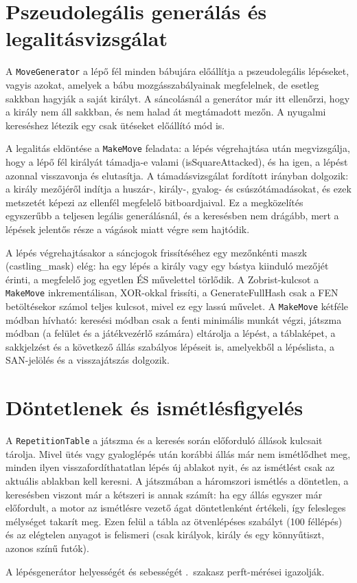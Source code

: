 \section{Pszeudolegális generálás és legalitásvizsgálat}

A \texttt{MoveGenerator} a lépő fél minden bábujára előállítja a pszeudolegális lépéseket, vagyis azokat, amelyek a bábu mozgásszabályainak megfelelnek, de esetleg sakkban hagyják a saját királyt. A sáncolásnál a generátor már itt ellenőrzi, hogy a király nem áll sakkban, és nem halad át megtámadott mezőn. A nyugalmi kereséshez létezik egy csak ütéseket előállító mód is.

A legalitás eldöntése a \texttt{MakeMove} feladata: a lépés végrehajtása után megvizsgálja, hogy a lépő fél királyát támadja-e valami (isSquareAttacked), és ha igen, a lépést azonnal visszavonja és elutasítja. A támadásvizsgálat fordított irányban dolgozik: a király mezőjéről indítja a huszár-, király-, gyalog- és csúszótámadásokat, és ezek metszetét képezi az ellenfél megfelelő bitboardjaival. Ez a megközelítés egyszerűbb a teljesen legális generálásnál, és a keresésben nem drágább, mert a lépések jelentős része a vágások miatt végre sem hajtódik.

A lépés végrehajtásakor a sáncjogok frissítéséhez egy mezőnkénti maszk (castling\_mask) elég: ha egy lépés a király vagy egy bástya kiinduló mezőjét érinti, a megfelelő jog egyetlen ÉS művelettel törlődik. A Zobrist-kulcsot a \texttt{MakeMove} inkrementálisan, XOR-okkal frissíti, a GenerateFullHash csak a FEN betöltésekor számol teljes kulcsot, mivel ez egy lassú művelet. A \texttt{MakeMove} kétféle módban hívható: keresési módban csak a fenti minimális munkát végzi, játszma módban (a felület és a játékvezérlő számára) eltárolja a lépést, a táblaképet, a sakkjelzést és a következő állás szabályos lépéseit is, amelyekből a lépéslista, a SAN-jelölés és a visszajátszás dolgozik.

\section{Döntetlenek és ismétlésfigyelés}

A \texttt{RepetitionTable} a játszma és a keresés során előforduló állások kulcsait tárolja. Mivel ütés vagy gyaloglépés után korábbi állás már nem ismétlődhet meg, minden ilyen visszafordíthatatlan lépés új ablakot nyit, és az ismétlést csak az aktuális ablakban kell keresni. A játszmában a háromszori ismétlés a döntetlen, a keresésben viszont már a kétszeri is annak számít: ha egy állás egyszer már előfordult, a motor az ismétlésre vezető ágat döntetlenként értékeli, így felesleges mélységet takarít meg. Ezen felül a tábla az ötvenlépéses szabályt (100 féllépés) és az elégtelen anyagot is felismeri (csak királyok, király és egy könnyűtiszt, azonos színű futók).

A lépésgenerátor helyességét és sebességét .~szakasz perft-mérései igazolják.

